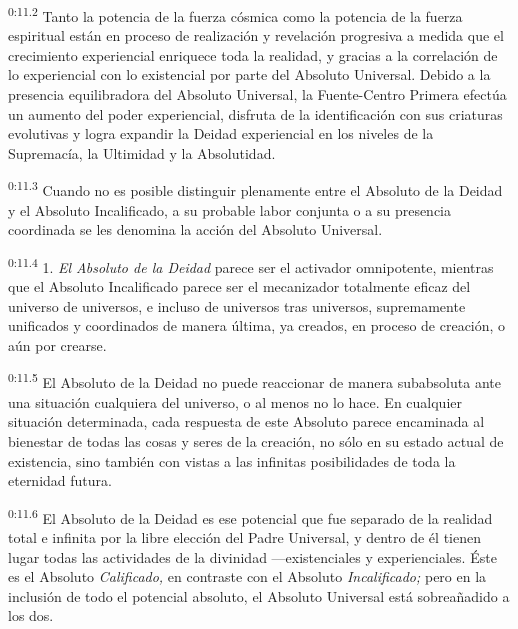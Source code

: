 \par
\textsuperscript{0:11.2} Tanto la potencia de la fuerza cósmica como la potencia de la fuerza espiritual están en proceso de realización y revelación progresiva a medida que el crecimiento experiencial enriquece toda la realidad, y gracias a la correlación de lo experiencial con lo existencial por parte del Absoluto Universal. Debido a la presencia equilibradora del Absoluto Universal, la Fuente-Centro Primera efectúa un aumento del poder experiencial, disfruta de la identificación con sus criaturas evolutivas y logra expandir la Deidad experiencial en los niveles de la Supremacía, la Ultimidad y la Absolutidad.

\par
\textsuperscript{0:11.3} Cuando no es posible distinguir plenamente entre el Absoluto de la Deidad y el Absoluto Incalificado, a su probable labor conjunta o a su presencia coordinada se les denomina la acción del Absoluto Universal.

\par
\textsuperscript{0:11.4} 1. \textit{El Absoluto de la Deidad} parece ser el activador omnipotente, mientras que el Absoluto Incalificado parece ser el mecanizador totalmente eficaz del universo de universos, e incluso de universos tras universos, supremamente unificados y coordinados de manera última, ya creados, en proceso de creación, o aún por crearse.

\par
\textsuperscript{0:11.5} El Absoluto de la Deidad no puede reaccionar de manera subabsoluta ante una situación cualquiera del universo, o al menos no lo hace. En cualquier situación determinada, cada respuesta de este Absoluto parece encaminada al bienestar de todas las cosas y seres de la creación, no sólo en su estado actual de existencia, sino también con vistas a las infinitas posibilidades de toda la eternidad futura.

\par
\textsuperscript{0:11.6} El Absoluto de la Deidad es ese potencial que fue separado de la realidad total e infinita por la libre elección del Padre Universal, y dentro de él tienen lugar todas las actividades de la divinidad ---existenciales y experienciales. Éste es el Absoluto \textit{Calificado,} en contraste con el Absoluto \textit{Incalificado;} pero en la inclusión de todo el potencial absoluto, el Absoluto Universal está sobreañadido a los dos.

